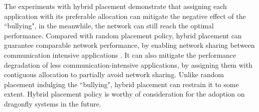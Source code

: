 The experiments with hybrid placement demonstrate that assigning each application with its preferable allocation can mitigate the negative effect of the ``bullying", in the meanwhile, 
the network can still reach the optimal performance.
Compared with random placement policy, hybrid placement can guarantee comparable network performance, by enabling network sharing between communication intensive applications .
It can also mitigate the performance degradation of less communication-intensive applications, 
by assigning them with contiguous allocation to partially avoid network sharing.
Unlike random placement indulging the ``bullying", hybrid placement can restrain it to some extent.
Hybrid placement policy is worthy of consideration for the adoption on dragonfly systems in the future.


